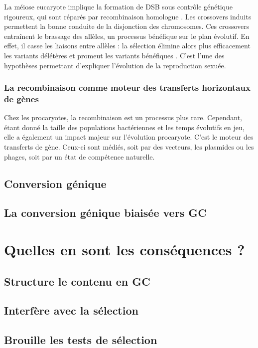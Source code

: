 \documentclass[11pt, oneside]{scrartcl}
\begin{document}
La méiose eucaryote implique la formation de DSB sous contrôle
génétique rigoureux, qui sont réparés par recombinaison homologue
\cite{chapman_playing_2012}. Les crossovers induits permettent la bonne conduite
de la disjonction des chromosomes. Ces crossovers entraînent le brassage des
allèles, un processus bénéfique sur le plan évolutif\cite{webster_direct_2012}.
En effet, il casse les liaisons entre allèles : la sélection élimine alors plus
efficacement les variants délétères et promeut les variants bénéfiques
\cite{otto_resolving_2002}. C'est l'une des hypothèses permettant d'expliquer
l'évolution de la reproduction sexuée\cite{otto_why_2006}.

\subsubsection{La recombinaison comme moteur des transferts horizontaux de gènes}
\label{sec:orgheadline5}
Chez les procaryotes, la recombinaison est un processus plus rare.
Cependant, étant donné la taille des populations bactériennes et les temps
évolutifs en jeu, elle a également un impact majeur sur l'évolution
procaryote\cite{didelot_impact_2010}. C'est le moteur des transferts de gène.
Ceux-ci sont médiés, soit par des vecteurs, les plasmides ou les phages, soit
par un état de compétence naturelle.

\subsection{Conversion génique}
\label{sec:orgheadline2}

\subsection{La conversion génique biaisée vers GC}
\label{sec:orgheadline7}
\section{Quelles en sont les conséquences ?}
\label{sec:orgheadline12}
\subsection{Structure le contenu en GC}
\label{sec:orgheadline9}
\subsection{Interfère avec la sélection}
\label{sec:orgheadline10}
\subsection{Brouille les tests de sélection}
\label{sec:orgheadline11}
\end{document}
